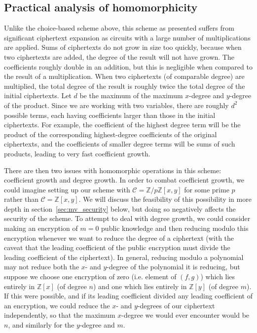 \documentclass[11pt]{report}
\newcommand{\Zx}{\mathbb{Z}[x]}
\newcommand{\Zy}{\mathbb{Z}[y]}
\newcommand{\Zxy}{\mathbb{Z}[x,y]}
\newcommand{\Zpxy}{\mathbb{Z}/p\mathbb{Z}[x,y]}
\begin{document}
\subsection{Practical analysis of homomorphicity}
\label{sec:mv_hom_analysis}
Unlike the choice-based scheme above, this scheme as presented suffers from significant ciphertext expansion as circuits with a large number of multiplications are applied. Sums of ciphertexts do not grow in size too quickly, because when two ciphertexts are added, the degree of the result will not have grown. The coefficients roughly double in an addition, but this is negligible when compared to the result of a multiplication. When two ciphertexts (of comparable degree) are multiplied, the total degree of the result is roughly twice the total degree of the initial ciphertexts. Let $d$ be the maximum of the maximum $x$-degree and $y$-degree of the product. Since we are working with two variables, there are roughly $d^2$ possible terms, each having coefficients larger than those in the initial ciphertexts. For example, the coefficient of the highest degree term will be the product of the corresponding highest-degree coefficients of the original ciphertexts, and the coefficients of smaller degree terms will be sums of such products, leading to very fast coefficient growth.

There are then two issues with homomorphic operations in this scheme: coefficient growth and degree growth. In order to combat coefficient growth, we could imagine setting up our scheme with $\mathcal{C} = \Zpxy$ for some prime $p$ rather than $\mathcal{C} = \Zxy$. We will discuss the feasibility of this possibility in more depth in section~\ref{sec:mv_security} below, but doing so negatively affects the security of the scheme. To attempt to deal with degree growth, we could consider making an encryption of $m=0$ public knowledge and then reducing modulo this encryption whenever we want to reduce the degree of a ciphertext (with the caveat that the leading coefficient of the public encryption must divide the leading coefficient of the ciphertext). In general, reducing modulo a polynomial may not reduce both the $x$- and $y$-degree of the polynomial it is reducing, but suppose we choose one encryption of zero (i.e. element of $(f,g)$) which lies entirely in $\Zx$ (of degree $n$) and one which lies entirely in $\Zy$ (of degree $m$). If this were possible, and if its leading coefficient divided any leading coefficient of an encryption, we could reduce the $x$- and $y$-degrees of our ciphertext independently, so that the maximum $x$-degree we would ever encounter would be $n$, and similarly for the $y$-degree and $m$.
\end{document}
